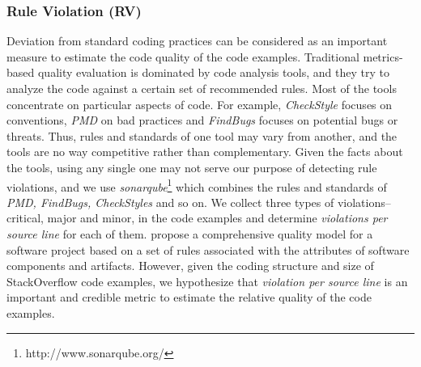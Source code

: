 \documentclass{sig-alternate}
\begin{document}
\subsubsection{Rule Violation (RV)}
Deviation from standard coding practices can be considered as an important measure to estimate the code quality of the code examples. Traditional metrics-based quality evaluation is dominated by code analysis tools, and they try to analyze the code against a certain set of recommended rules. Most of the tools concentrate on  particular aspects of code. For example, \emph{CheckStyle} focuses on conventions, \emph{PMD} on bad practices and \emph{FindBugs} focuses on potential bugs or threats. Thus, rules and standards of one tool may vary from another, and the tools are no way competitive rather than complementary. Given the facts about the tools, using any single one may not serve our purpose of detecting rule violations, and we use \emph{sonarqube}\footnote{http://www.sonarqube.org/} which combines the rules and standards of \emph{PMD, FindBugs, CheckStyles} and so on. We collect three types of violations-- critical, major and minor, in the code examples and determine \emph{violations per source line} for each of them. \citet{lochmann} propose a comprehensive quality model for a software project based on a set of rules associated with the attributes of software components and artifacts. However, given the coding structure and size of StackOverflow code examples, we hypothesize that \emph{violation per source line} is an important and credible metric to estimate the relative quality of the code examples.  
\end{document}
